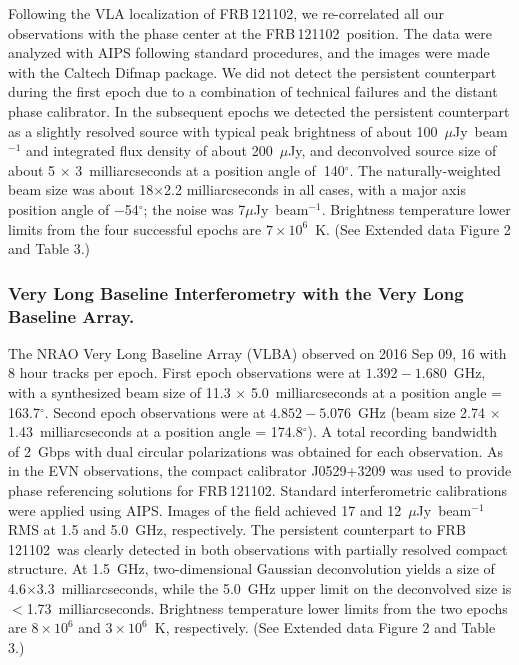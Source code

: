 \documentclass{nature_frb}
\newcommand{\frb}{FRB\,121102}
\newcommand{\uJy}{$\mu$Jy}
\newcommand{\degree}{\ensuremath{^\circ}}
\begin{document}
Following the VLA localization of \frb, we re-correlated all our observations with the phase center at the \frb\ position. The data were analyzed with AIPS following standard procedures, and the images were made with the Caltech Difmap package. We did not detect the persistent counterpart during the first epoch due to a combination of technical failures and the distant phase calibrator.
In the subsequent epochs we detected the persistent counterpart as a
slightly resolved source with typical peak brightness of about 100~\uJy~beam$^{-1}$ and integrated flux density of about 200~\uJy, and deconvolved source size of about 5 $\times$ 3~milliarcseconds at a position angle of $~$140\degree. The naturally-weighted beam size was about 18$\times$2.2 milliarcseconds in all cases, with a major axis position angle of $-$54\degree; the noise was 7\uJy~beam$^{-1}$.  Brightness temperature lower limits from the four successful epochs are $7 \times 10^6$~K.  (See Extended data Figure 2 and Table 3.)

\subsubsection*{Very Long Baseline Interferometry with the Very Long Baseline Array.}

The NRAO Very Long Baseline Array (VLBA) observed on 2016 Sep 09, 16 with 8 hour tracks per epoch. First epoch observations were at $1.392-1.680$~GHz, with a synthesized beam size of 11.3 $\times$ 5.0~milliarcseconds at a position angle = 163.7\degree.
Second epoch observations were at $4.852-5.076$~GHz (beam size 2.74 $\times$ 1.43~milliarcseconds at a position angle = 174.8\degree).
A total recording bandwidth of 2~Gbps with dual circular polarizations was obtained for each observation.  As in the EVN observations, the compact calibrator J0529+3209 was used to provide phase referencing solutions for \frb.  Standard interferometric calibrations were applied using AIPS.  Images of the field achieved 17 and 12~\uJy~beam$^{-1}$ RMS at 1.5 and 5.0~GHz, respectively. The persistent counterpart to \frb\ was clearly detected in both observations with partially resolved compact structure.
At 1.5~GHz, two-dimensional Gaussian deconvolution yields a size of 4.6$\times$3.3~milliarcseconds, while the 5.0~GHz upper limit on the deconvolved size is $<$1.73~milliarcseconds.
Brightness temperature lower limits from the two epochs are $8 \times 10^6$ and $3 \times 10^6$~K, respectively.  (See Extended data Figure 2 and Table 3.)
\end{document}
